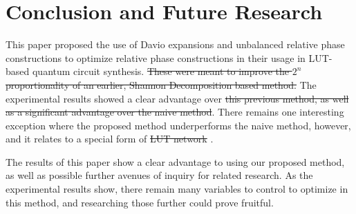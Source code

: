 \documentclass[paper]{ieice}
\providecommand{\DIFadd}[1]{{\protect\color{blue}{#1}}} %
\providecommand{\DIFdel}[1]{{\protect\color{red}\sout{#1}}}                      %
\providecommand{\DIFaddbegin}{} %
\providecommand{\DIFaddend}{} %
\providecommand{\DIFdelbegin}{} %
\providecommand{\DIFdelend}{} %
\newcommand{\DIFscaledelfig}{0.5}
\newlength{\DIFdelgraphicswidth} %
\newlength{\DIFdelgraphicsheight} %
\newcommand{\DIFaddincludegraphics}[2][]{{\color{blue}\fbox{\DIFOincludegraphics[#1]{#2}}}} %
\newcommand{\DIFdelincludegraphics}[2][]{%
\sbox{\DIFdelgraphicsbox}{\DIFOincludegraphics[#1]{#2}}%
\settoboxwidth{\DIFdelgraphicswidth}{\DIFdelgraphicsbox} %
\settoboxtotalheight{\DIFdelgraphicsheight}{\DIFdelgraphicsbox} %
\scalebox{\DIFscaledelfig}{%
\parbox[b]{\DIFdelgraphicswidth}{\usebox{\DIFdelgraphicsbox}\\[-\baselineskip] \rule{\DIFdelgraphicswidth}{0em}}\llap{\resizebox{\DIFdelgraphicswidth}{\DIFdelgraphicsheight}{%
\setlength{\unitlength}{\DIFdelgraphicswidth}%
\begin{picture}(1,1)%
\thicklines\linethickness{2pt} %
{\color[rgb]{1,0,0}\put(0,0){\framebox(1,1){}}}%
{\color[rgb]{1,0,0}\put(0,0){\line( 1,1){1}}}%
{\color[rgb]{1,0,0}\put(0,1){\line(1,-1){1}}}%
\end{picture}%
}\hspace*{3pt}}} %
} %
\DeclareRobustCommand{\DIFaddbegin}{\DIFOaddbegin \let\includegraphics\DIFaddincludegraphics} %
\DeclareRobustCommand{\DIFaddend}{\DIFOaddend \let\includegraphics\DIFOincludegraphics} %
\DeclareRobustCommand{\DIFdelbegin}{\DIFOdelbegin \let\includegraphics\DIFdelincludegraphics} %
\DeclareRobustCommand{\DIFdelend}{\DIFOaddend \let\includegraphics\DIFOincludegraphics} %
\begin{document}
\vspace*{-0.25cm}
\section{Conclusion and Future Research}
\label{Sec:concl}
\DIFdelbegin %

\DIFdelend This paper proposed the use of \DIFaddbegin \DIFadd{Shannon's Decomposition, }\DIFaddend Davio expansions and \DIFaddbegin \DIFadd{alternating
balanced/}\DIFaddend unbalanced relative phase constructions to optimize relative phase constructions
in their usage in LUT-based quantum circuit synthesis. \DIFdelbegin \DIFdel{These were meant to improve the $2^n$ proportionality of an earlier, Shannon Decomposition based method. }\DIFdelend The experimental results showed a
clear advantage over \DIFdelbegin \DIFdel{this previous method, as well as a significant advantage over the naive method}\DIFdelend \DIFaddbegin \DIFadd{the naive case, and Davio Expansions and balanced/unblanced constructions
prove effective at dealing with corner cases that hinder the Shannon Only case}\DIFaddend . There remains 
one interesting exception where the proposed method underperforms the naive method, however, 
and it relates to a special form of \DIFdelbegin \DIFdel{LUT network }\DIFdelend \DIFaddbegin \DIFadd{Boolean logic network which consists of independent output gates}\DIFaddend .

The results of this paper show a clear advantage to using our proposed method, as well as possible further avenues of inquiry for related research. As the experimental results show, there remain many variables to control to optimize in this method, and researching those further could prove fruitful.


\end{document}
